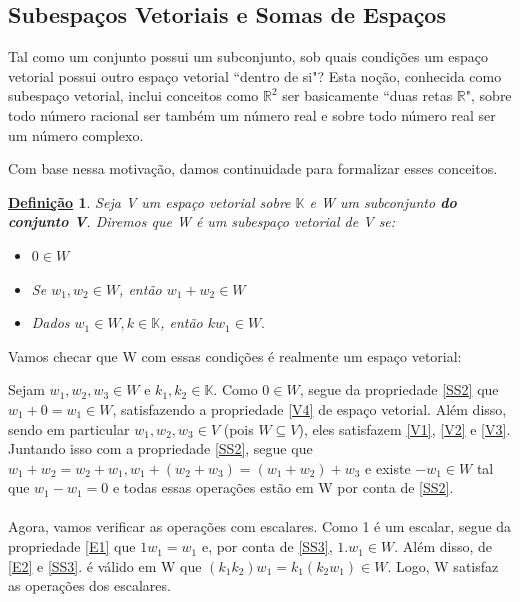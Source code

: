 \documentclass{article}
\newtheorem*{def*}{\underline{Defini\c c\~ao}}
\begin{document}
\subsection{Subespa\c cos Vetoriais e Somas de Espa\c cos}
Tal como um conjunto possui um subconjunto, sob quais condi\c c\~oes um espa\c co vetorial possui
outro espa\c co vetorial ``dentro de si"? Esta no\c c\~ao, conhecida como subespa\c co vetorial,
inclui conceitos como $\mathbb{R}^2$ ser basicamente ``duas retas $\mathbb{R}$", sobre todo n\'umero
racional ser tamb\'em um n\'umero real e sobre todo n\'umero real ser um n\'umero complexo.

Com base nessa motiva\c c\~ao, damos continuidade para formalizar esses conceitos.

\begin{def*}
	Seja V um espa\c co vetorial sobre $\mathbb{K}$ e W um subconjunto \textbf{do conjunto V}.
	Diremos que W \'e um subespa\c co vetorial de V se:
	\begin{itemize}
		\item [SS1)] $0\in{W}$ \label{SS1}
		\item [SS2)] Se $w_1, w_2\in{W}$, ent\~ao $w_1 + w_2 \in{W}$ \label{SS2}
		\item [SS3)] Dados $w_1 \in{W}, k\in\mathbb{K}$, ent\~ao $kw_1 \in{W}.$ \label{SS3}
	\end{itemize}
\end{def*}

Vamos checar que W com essas condi\c c\~oes \'e realmente um espa\c co vetorial:

Sejam $w_1, w_2, w_3\in{W}$ e $k_1, k_2\in\mathbb{K}$. Como $0\in{W}$, segue da propriedade \ref{SS2}
que $w_1 + 0 = w_1 \in{W}$, satisfazendo a propriedade \ref{V4} de espa\c co vetorial. Al\'em disso, sendo
em particular $w_1, w_2, w_3\in{V}$ (pois $W\subseteq{V}$), eles satisfazem \ref{V1}, \ref{V2} e \ref{V3}.
Juntando isso com a propriedade \ref{SS2}, segue que $w_1 + w_2 = w_2 + w_1, w_1 + (w_2 + w_3) = (w_1 + w_2) + w_3$ e
existe $-w_1\in{W}$ tal que $w_1 - w_1 = 0$ e todas essas opera\c c\~oes est\~ao em W por conta de \ref{SS2}.
\paragraph*{} Agora, vamos verificar as opera\c c\~oes com escalares. Como 1 \'e um escalar, segue
da propriedade \ref{E1} que $1w_1 = w_1$ e, por conta de \ref{SS3}, $1.w_1\in{W}.$ Al\'em disso,
de \ref{E2} e \ref{SS3}. \'e v\'alido em W que $(k_1k_2)w_1 = k_1(k_2w_1)\in{W}.$ Logo, W
satisfaz as opera\c c\~oes dos escalares.
\end{document}
